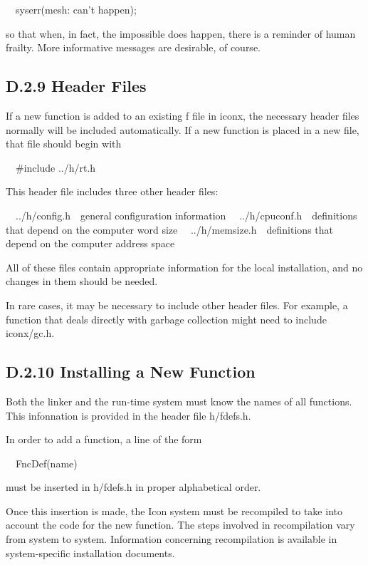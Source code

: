 {\ttfamily\mdseries
\ \ syserr({\textquotedbl}mesh: can't happen{\textquotedbl});}

\noindent so that when, in fact, the
{\textquotedbl}impossible{\textquotedbl} does happen, there is a
reminder of human frailty.  More informative messages are desirable,
of course.

\subsection[D.2.9 Header Files]{D.2.9 Header Files}

If a new function is added to an existing f file in iconx, the
necessary header files normally will be included automatically. If a
new function is placed in a new file, that file should begin with

{\ttfamily\mdseries
\ \ \#include {\textquotedbl}../h/rt.h{\textquotedbl}}


This header file includes three other header files:


\ \ ../h/config.h\ \ general configuration information\newline
\ \ ../h/cpuconf.h\ \ definitions that depend on the computer word size\newline
\ \ ../h/memsize.h\ \ definitions that depend on the computer address space


All of these files contain appropriate information for the local
installation, and no changes in them should be needed.


In rare cases, it may be necessary to include other header files. For
example, a function that deals directly with garbage collection might
need to include \textsf{iconx/gc.h.}

\subsection[D.2.10 Installing a New Function]{D.2.10 Installing a New Function}

Both the linker and the run-time system must know the names of all
functions. This infonnation is provided in the header file h/fdefs.h.


In order to add a function, a line of the form

{\ttfamily\mdseries
\ \ FncDef(name)}

\noindent must be inserted in h/fdefs.h in proper alphabetical order.

Once this insertion is made, the Icon system must be recompiled to
take into account the code for the new function. The steps involved in
recompilation vary from system to system. Information concerning
recompilation is available in system-specific installation documents.

